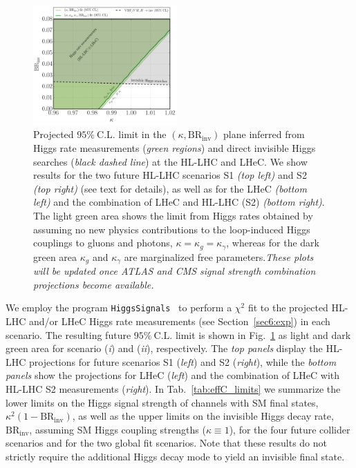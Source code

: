 \documentclass[../report.tex]{subfiles}
\newcommand{\BRHinv}{\mathrm{BR}_\mathrm{inv}}
\begin{document}
\begin{figure}
\hfill
\includegraphics[width=0.49\textwidth]{section6/kappa_BR_LHeC_HLLHCS2_BRinv0p0225}
\caption{Projected $95\%~\mathrm{C.L.}$ limit in the $(\kappa, \BRHinv)$ plane inferred from Higgs rate measurements (\emph{green regions}) and direct invisible Higgs searches (\emph{black dashed line}) at the HL-LHC and LHeC. {We show results for the two future HL-LHC scenarios S1 {\sl (top left)} and S2 {\sl (top right)} (see text for details), as well as for the LHeC {\sl (bottom left)} and the combination of LHeC and HL-LHC (S2) {\sl (bottom right)}.} The light green area shows the limit from Higgs rates obtained by assuming no new physics contributions to the loop-induced Higgs couplings to gluons and photons, $\kappa = \kappa_g = \kappa_\gamma$, whereas for the dark green area $\kappa_g$ and $\kappa_\gamma$ are marginalized free parameters.{\sl These plots will be updated once ATLAS and CMS signal strength combination projections become available.} }
\label{fig:effC}
\end{figure}

We employ the program \texttt{HiggsSignals}~\cite{Bechtle:2013xfa,Bechtle:2014ewa} to perform a $\chi^2$ fit to the projected HL-LHC {and/or LHeC} Higgs rate measurements (see Section~\ref{sec6:exp})  in each scenario. The resulting future $95\%~\mathrm{C.L.}$ limit is shown in Fig.~\ref{fig:effC} as light and dark green area for scenario (\emph{i}) and (\emph{ii}), respectively. {The \emph{top panels} display the HL-LHC projections for future scenarios S1 (\emph{left}) and S2 (\emph{right}), while the \emph{bottom panels} show the projections for LHeC (\emph{left}) and the combination of LHeC with HL-LHC S2 measurements (\emph{right}).} {In Tab.~\ref{tab:effC_limits} we summarize the lower limits on the Higgs signal strength of channels with SM final states, $\kappa^2 (1-\BRHinv)$, as well as the upper limits on the invisible Higgs decay rate, $\mathrm{BR}_\text{inv}$, assuming SM Higgs coupling strengths ($\kappa \equiv 1$), for the four future collider scenarios and for the two global fit scenarios.} Note that these results do not strictly require the additional Higgs decay mode to yield an invisible final state.
\end{document}
